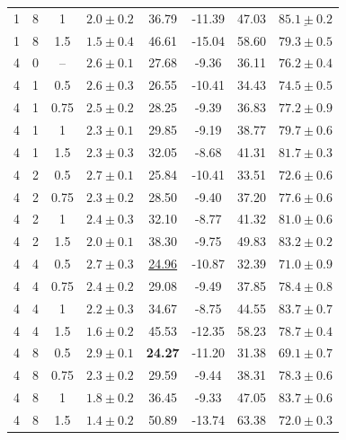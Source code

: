 \documentclass{article}
\begin{document}
\begin{table}[!htbp]
\begin{tabular}{cccccccc}
1 & 8 & 1 & $2.0\pm0.2$ & 36.79 & -11.39 & 47.03 & $\underline{85.1\pm0.2}$\\
1 & 8 & 1.5 & $1.5\pm0.4$ & 46.61 & -15.04 & 58.60 & $79.3\pm0.5$\\
\midrule
4 & 0 & -- & $2.6\pm0.1$ & 27.68 & -9.36 & 36.11 & $76.2\pm0.4$\\
4 & 1 & 0.5 & $2.6\pm0.3$ & 26.55 & -10.41 & 34.43 & $74.5\pm0.5$\\
4 & 1 & 0.75 & $2.5\pm0.2$ & 28.25 & -9.39 & 36.83 & $77.2\pm0.9$\\
4 & 1 & 1 & $2.3\pm0.1$ & 29.85 & -9.19 & 38.77 & $79.7\pm0.6$\\
4 & 1 & 1.5 & $2.3\pm0.3$ & 32.05 & -8.68 & 41.31 & $81.7\pm0.3$\\
4 & 2 & 0.5 & $2.7\pm0.1$ & 25.84 & -10.41 & 33.51 & $72.6\pm0.6$\\
4 & 2 & 0.75 & $2.3\pm0.2$ & 28.50 & -9.40 & 37.20 & $77.6\pm0.6$\\
4 & 2 & 1 & $2.4\pm0.3$ & 32.10 & -8.77 & 41.32 & $81.0\pm0.6$\\
4 & 2 & 1.5 & $2.0\pm0.1$ & 38.30 & -9.75 & 49.83 & $83.2\pm0.2$\\
4 & 4 & 0.5 & $2.7\pm0.3$ & \underline{24.96}& -10.87 & 32.39 & $71.0\pm0.9$\\
4 & 4 & 0.75 & $2.4\pm0.2$ & 29.08 & -9.49 & 37.85 & $78.4\pm0.8$\\
4 & 4 & 1 & $2.2\pm0.3$ & 34.67 & -8.75 & 44.55 & $83.7\pm0.7$\\
4 & 4 & 1.5 & $1.6\pm0.2$ & 45.53 & -12.35 & 58.23 & $78.7\pm0.4$\\
4 & 8 & 0.5 & $\mathbf{2.9\pm0.1}$& \textbf{24.27}& -11.20 & 31.38 & $69.1\pm0.7$\\
4 & 8 & 0.75 & $2.3\pm0.2$ & 29.59 & -9.44 & 38.31 & $78.3\pm0.6$\\
4 & 8 & 1 & $1.8\pm0.2$ & 36.45 & -9.33 & 47.05 & $83.7\pm0.6$\\
4 & 8 & 1.5 & $1.4\pm0.2$ & 50.89 & -13.74 & 63.38 & $72.0\pm0.3$\\
\bottomrule
\end{tabular}
\end{table}
\clearpage
\end{document}
